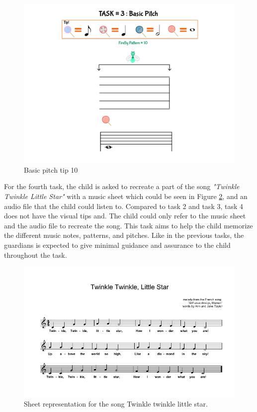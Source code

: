 \begin{figure}[H]
    \centering
    \includegraphics[width=12cm]{figures/NewFigures/BasicPitchTip10.png}
    \caption{Basic pitch tip 10}
    \label{fig:BasicPitchTip10}
\end{figure}

For the fourth task, the child is asked to recreate a part of the song \textit{"Twinkle Twinkle Little Star"} with a music sheet which could be seen in Figure \ref{fig:TTLSMusicSheet}, and an audio file that the child could listen to. Compared to task 2 and task 3, task 4 does not have the visual tips and. The child could only refer to the music sheet and the audio file to recreate the song. This task aims to help the child memorize the different music notes, patterns, and pitches. Like in the previous tasks, the guardians is expected to give minimal guidance and assurance to the child throughout the task. 

\begin{figure}[H!]
    \centering
    \includegraphics[width=15cm]{figures/NewFigures/TwinkleTwinkleLittleStarMusicSheet.png}
    \caption{Sheet representation for the song Twinkle twinkle little star.}
    \label{fig:TTLSMusicSheet}
\end{figure}

